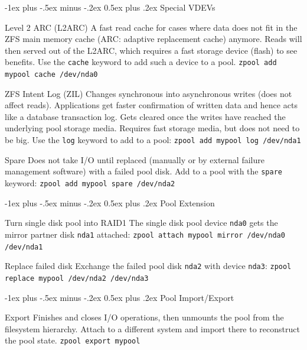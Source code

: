 \documentclass[10pt,landscape,letter]{article}
\makeatletter
\renewcommand{\section}{\@startsection{section}{1}{0mm}%
                                {-1ex plus -.5ex minus -.2ex}%
                                {0.5ex plus .2ex}%
                                {\normalfont\large\bfseries}}
\makeatother
\begin{document}
\begin{multicols}{3}
  \section{Special VDEVs}
	\begin{Description}
    \item[Level 2 ARC (L2ARC)] A fast read cache for cases where data does not
      fit in the ZFS main memory cache (ARC: adaptive replacement cache)
      anymore. Reads will then served out of the L2ARC, which requires a fast
      storage device (flash) to see benefits. Use the \texttt{cache} keyword to
      add such a device to a pool. \texttt{zpool add mypool cache /dev/nda0}
    \item[ZFS Intent Log (ZIL)] Changes synchronous into asynchronous writes
      (does not affect reads). Applications get faster confirmation of written
      data and hence acts like a database transaction log. Gets cleared once
      the writes have reached the underlying pool storage media. Requires fast
      storage media, but does not need to be big. Use the \texttt{log} keyword
      to add to a pool: \texttt{zpool add mypool log /dev/nda1}
    \item[Spare] Does not take I/O until replaced (manually or by external
      failure management software) with a failed pool disk. Add to a pool with
      the \texttt{spare} keyword: \texttt{zpool add mypool spare /dev/nda2}
  \end{Description}

  \section{Pool Extension}
	\begin{Description}
    \item[Turn single disk pool into RAID1] The single disk pool device
      \texttt{nda0} gets the mirror partner disk \texttt{nda1} attached:
      \texttt{zpool attach mypool mirror /dev/nda0 /dev/nda1}
    \item[Replace failed disk] Exchange the failed pool disk \texttt{nda2} with
  device \texttt{nda3}: \texttt{zpool replace mypool /dev/nda2 /dev/nda3}
  \end{Description}

  \section{Pool Import/Export}
	\begin{Description}
    \item[Export] Finishes and closes I/O operations, then unmounts the pool
      from the filesystem hierarchy. Attach to a different system and import
      there to reconstruct the pool state. \texttt{zpool export mypool}


\end{Description}
\end{multicols}
\end{document}
